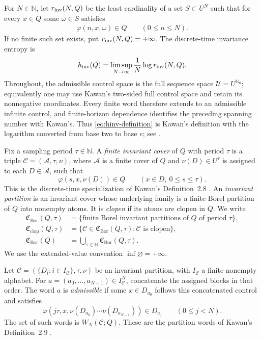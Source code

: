 \documentclass[11pt,reqno]{amsart}
\numberwithin{equation}{section}
\theoremstyle{definition}
\newcommand{\N}{\mathbb N}
\newcommand{\Nzero}{\mathbb N_0}
\newcommand{\C}{\mathcal C}
\newcommand{\Acal}{\mathcal A}
\newcommand{\hinv}{h_{\mathrm{inv}}}
\newcommand{\Bor}{\mathrm{Bor}}
\newcommand{\clop}{\mathrm{clop}}
\begin{document}
For $N\in\N$, let $r_{\rm inv}(N,Q)$ be the least cardinality of a set
$S\subset U^N$ such that for every $x\in Q$ some $\omega\in S$ satisfies
\begin{align*}
 \varphi(n,x,\omega)\in Q\qquad(0\le n\le N).
\end{align*}
If no finite such set exists, put $r_{\rm inv}(N,Q)=+\infty$.  The
discrete-time invariance entropy is
\begin{equation}\label{eq:hinv-definition}
 \hinv(Q)=\limsup_{N\to\infty}\frac1N\log r_{\rm inv}(N,Q).
\end{equation}
Throughout, the admissible control space is the full sequence space
$\mathcal U=U^{\Nzero}$; equivalently one may use Kawan's two-sided full
control space and retain its nonnegative coordinates.  Every finite word
therefore extends to an admissible infinite control, and finite-horizon
dependence identifies the preceding spanning number with Kawan's.  Thus
\eqref{eq:hinv-definition} is Kawan's definition with the logarithm converted
from base two to base $e$; see \cite[Definition~2.2, p.~44]{Kawan2013}.

Fix a sampling period $\tau\in\N$.  A \emph{finite invariant cover} of $Q$
with period $\tau$ is a triple $\C=(\Acal,\tau,\nu)$, where $\Acal$ is a finite
cover of $Q$ and $\nu(D)\in U^\tau$ is assigned to each $D\in\Acal$, such that
\begin{equation}\label{eq:invariant-cover}
 \varphi(s,x,\nu(D))\in Q
 \qquad(x\in D,\ 0\le s\le\tau).
\end{equation}
This is the discrete-time specialization of Kawan's Definition~2.8
\cite[p.~79]{Kawan2013}.  An \emph{invariant partition} is an invariant cover
whose underlying family is a finite Borel partition of $Q$ into nonempty
atoms.  It is \emph{clopen} if its atoms are clopen in $Q$.  We write
\begin{align*}
 \mathfrak C_{\Bor}(Q,\tau)&=\bigl\{\text{finite Borel invariant partitions of
 }Q\text{ of period }\tau\bigr\},\\
 \mathfrak C_{\clop}(Q,\tau)&=\bigl\{\C\in\mathfrak C_{\Bor}(Q,\tau):
 \C\text{ is clopen}\bigr\},\\
 \mathfrak C_{\Bor}(Q)&=\bigcup_{\tau\in\N}\mathfrak C_{\Bor}(Q,\tau).
\end{align*}
We use the extended-value convention $\inf\varnothing=+\infty$.

Let $\C=(\{D_i:i\in I_\C\},\tau,\nu)$ be an invariant partition, with
$I_\C$ a finite nonempty alphabet.  For
$a=(a_0,\ldots,a_{N-1})\in I_\C^N$, concatenate the assigned blocks in that
order.  The word $a$ is \emph{admissible} if some $x\in D_{a_0}$ follows this
concatenated control and satisfies
\begin{equation}\label{eq:admissible-word}
 \varphi(j\tau,x,\nu(D_{a_0})\cdots\nu(D_{a_{N-1}}))
 \in D_{a_j}\qquad(0\le j<N).
\end{equation}
The set of such words is $W_N(\C;Q)$.  These are the partition words of
Kawan's Definition~2.9 \cite[pp.~79--80]{Kawan2013}.
\end{document}
